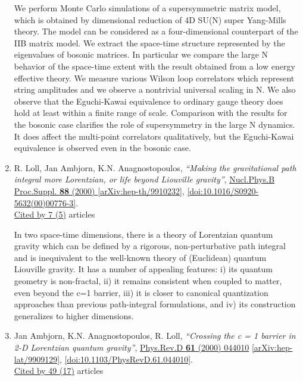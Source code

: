 \documentclass[a4paper,10pt]{article}
\begin{document}
\begin{enumerate}
We perform Monte Carlo simulations of a supersymmetric matrix model, which is obtained by dimensional reduction of 4D SU(N) super Yang-Mills theory. The model can be considered as a four-dimensional counterpart of the IIB matrix model. We extract the space-time structure represented by the eigenvalues of bosonic matrices. In particular we compare the large N behavior of the space-time extent with the result obtained from a low energy effective theory. We measure various Wilson loop correlators which represent string amplitudes and we observe a nontrivial universal scaling in N. We also observe that the Eguchi-Kawai equivalence to ordinary gauge theory does hold at least within a finite range of scale. Comparison with the results for the bosonic case clarifies the role of supersymmetry in the large N dynamics. It does affect the multi-point correlators qualitatively, but the Eguchi-Kawai equivalence is observed even in the bosonic case.
\item R. Loll, Jan Ambjorn, K.N. Anagnostopoulos, {\it ``Making the gravitational path integral more Lorentzian, or life beyond Liouville gravity''}, \href{https://www.doi.org/10.1016/S0920-5632(00)00776-3}{Nucl.Phys.B Proc.Suppl. {\bf 88} (2000) } \href{https://arxiv.org/abs/hep-th/9910232}{[arXiv:hep-th/9910232]}, \href{https://www.doi.org/10.1016/S0920-5632(00)00776-3}{[doi:10.1016/S0920-5632(00)00776-3]}.
\\\href{https://inspirehep.net/literature/?q=refersto%3Arecid%3A509292}{Cited by 7 (5)} articles

In two space-time dimensions, there is a theory of Lorentzian quantum gravity which can be defined by a rigorous, non-perturbative path integral and is inequivalent to the well-known theory of (Euclidean) quantum Liouville gravity. It has a number of appealing features: i) its quantum geometry is non-fractal, ii) it remains consistent when coupled to matter, even beyond the c=1 barrier, iii) it is closer to canonical quantization approaches than previous path-integral formulations, and iv) its construction generalizes to higher dimensions.
\item Jan Ambjorn, K.N. Anagnostopoulos, R. Loll, {\it ``Crossing the c = 1 barrier in 2-D Lorentzian quantum gravity''}, \href{https://www.doi.org/10.1103/PhysRevD.61.044010}{Phys.Rev.D {\bf 61} (2000) 044010} \href{https://arxiv.org/abs/hep-lat/9909129}{[arXiv:hep-lat/9909129]}, \href{https://www.doi.org/10.1103/PhysRevD.61.044010}{[doi:10.1103/PhysRevD.61.044010]}.
\\\href{https://inspirehep.net/literature/?q=refersto%3Arecid%3A507367}{Cited by 49 (17)} articles


\end{enumerate}
\end{document}
